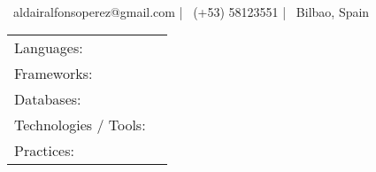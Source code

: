 \documentclass[]{awesome-cv}
\begin{document}
\begin{center}
	  \\
	\vspace{2mm}
	{\hspace{0.8cm}\faEnvelope\ aldairalfonsoperez@gmail.com}  |  {\faMobile\ (+53) 58123551}  |  {\faMapMarker\ Bilbao, Spain}
\end{center}

\begin{cventries}
	\cventry
	{}
	{\def\arraystretch{1.15}{\begin{tabular}{ l l }
				Languages:                            & {\skill{ C\#, Python, C, C++, SQL, JavaScript.}}                                  \\
				Frameworks:                           & {\skill{ .Net, ASP.NET, Django, FastAPI.}}                                        \\
				Databases:                            & {\skill{ MySQL, PostgreSQL, SQLite.}}                                             \\
				Technologies / Tools: \hspace{0.05cm} & {\skill{ Docker, npm, Git.}}                                                      \\
				Practices:                            & {\skill{ Agile, Scrum, SOLID Principles, Test-Driven Development, Code Reviews.}} \\
			\end{tabular}}}
	{}
	{}
	{}
\end{cventries}
\vspace{-7mm}
\end{document}
